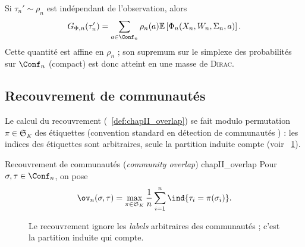 \begin{Preuve}
Si $\tau_n'\sim\rho_n$ est indépendant de l'observation, alors
\[
    G_{\Phi,n}(\tau_n')
    =
    \sum_{a\in\Conf_n}\rho_n(a)
    \mathbb E\left[\Phi_n(X_n,W_n,\Sigma_n,a)\right].
\]
Cette quantité est affine en $\rho_n$ ; son supremum sur le simplexe des probabilités sur $\Conf_n$ (compact) est donc atteint en une masse de \textsc{Dirac}. 
\end{Preuve}

\subsection{Recouvrement de communautés}

Le calcul du recouvrement (\Def~\ref{def:chapII_overlap}) se fait modulo permutation $\pi\in {\mathfrak{S}}_K$ des étiquettes (convention standard en détection de communautés \cite{Abbe2017}) : les indices des étiquettes sont arbitraires, seule la partition induite compte (voir \Fig~\ref{fig:chapII_overlap}).

\begin{Definition}{Recouvrement de communautés (\emph{community overlap}) \cite{Abbe2017,SankararamanBaccelli2018}}{chapII_overlap}
Pour $\sigma,\tau\in\Conf_n$, on pose
\begin{equation}
    \ov_n(\sigma,\tau)
    =
    \max_{\pi\in\mathfrak S_K}
    \frac1n\sum_{i=1}^n \ind{\tau_i=\pi(\sigma_i)}.
    \label{eq:chapII_overlap}
\end{equation}
\end{Definition}
\begin{figure}[H]
\centering
{}
\caption{Le recouvrement ignore les \emph{labels} arbitraires des communautés ; c'est la partition induite qui compte.}
\label{fig:chapII_overlap}
\end{figure}

